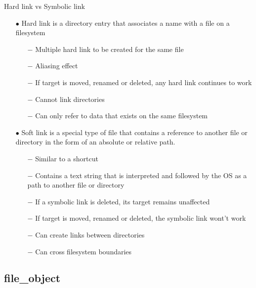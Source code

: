 \documentclass{beamer}
\begin{document}
\begin{frame}{Hard link vs Symbolic link}
	\begin{itemize}[<+->]
		\item[$\bullet$]{Hard link is a directory entry that associates a name with a file on a filesystem}
			\begin{itemize}
				\item[$-$]{Multiple hard link to be created for the same file}
				\item[$-$]{Aliasing effect}
				\item[$-$]{If target is moved, renamed or deleted, any hard link continues to work}
				\item[$-$]{Cannot link directories}
				\item[$-$]{Can only refer to data that exists on the same filesystem}
			\end{itemize}

		\item[$\bullet$]{Soft link is a special type of file that contains a reference to another file or directory in the form of an absolute or relative path.}
			\begin{itemize}
				\item[$-$]{Similar to a shortcut}
				\item[$-$]{Contains a text string that is interpreted and followed by the OS as a path to another file or directory}
				\item[$-$]{If a symbolic link is deleted, its target remains unaffected}
				\item[$-$]{If target is moved, renamed or deleted, the symbolic link wont't work}
				\item[$-$]{Can create links between directories}
				\item[$-$]{Can cross filesystem boundaries}
			\end{itemize}

	\end{itemize}
\end{frame}


\subsection{file\_object}
\end{document}
